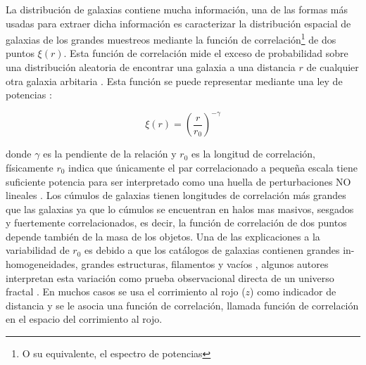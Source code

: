 \documentclass[12pt]{article}
\begin{document}
La distribución de galaxias contiene mucha información, una de las formas más 
usadas para extraer dicha información es caracterizar la distribución espacial 
de galaxias de los grandes muestreos mediante la función de 
correlación\footnote{O su equivalente, el espectro de potencias} de dos puntos 
$\xi(r)$. Esta función de correlación mide el exceso de probabilidad sobre una 
distribución aleatoria de encontrar una galaxia a una distancia $r$ de 
cualquier otra galaxia arbitaria 
\cite{1980lssu.book.....P}\cite{1993A&A...280....5M}. Esta función se puede 
representar mediante una ley de potencias 
\cite{1983ApJ...267..465D}\cite{1993A&A...280....5M}: 

$$\xi(r)=\left(\frac{r}{r_0}\right)^{-\gamma}$$

donde $\gamma$ es la pendiente de la relación y $r_0$  es la longitud de 
correlación, físicamente $r_0$ indica que únicamente el par correlacionado a 
pequeña escala tiene suficiente potencia para ser interpretado como una huella 
de perturbaciones NO lineales \cite{1993A&A...280....5M}. Los cúmulos de 
galaxias tienen longitudes de correlación más grandes que las galaxias ya que 
lo cúmulos se encuentran en halos mas masivos, sesgados y fuertemente 
correlacionados, es decir, la función de correlación de dos puntos depende 
también de la masa de los objetos. Una de las explicaciones  a la variabilidad 
de $r_0$ es debido a que los catálogos de galaxias contienen grandes 
in-homogeneidades, grandes estructuras, filamentos y vacíos 
\cite{2005MNRAS.357..608Y}, algunos autores interpretan esta variación como 
prueba observacional directa de un universo fractal \cite{1987PhyA..144..257P}. 
En muchos casos se usa el corrimiento al rojo ($z$) como indicador de distancia 
y se le asocia una función de correlación, llamada función de correlación en 
el espacio del corrimiento al rojo. \\
\end{document}

